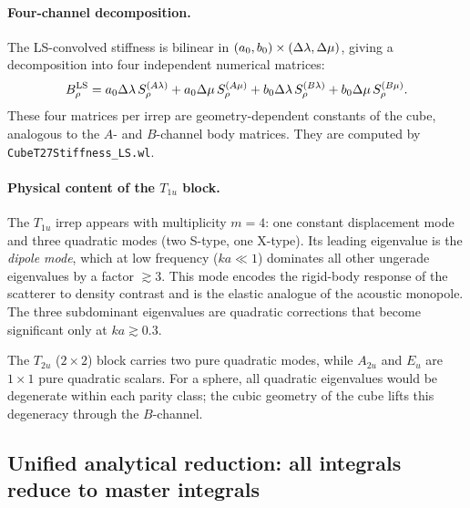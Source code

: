 \paragraph{Four-channel decomposition.}
The LS-convolved stiffness is bilinear in
$(a_0, b_0) \times (\Delta\lambda, \Delta\mu)$, giving a decomposition into
four independent numerical matrices:
\begin{equation}
  B^{\text{LS}}_\rho
  = a_0 \Delta\lambda\,S^{(A\lambda)}_\rho
  + a_0 \Delta\mu\,S^{(A\mu)}_\rho
  + b_0 \Delta\lambda\,S^{(B\lambda)}_\rho
  + b_0 \Delta\mu\,S^{(B\mu)}_\rho.
  \label{eq:four-channel}
\end{equation}
These four matrices per irrep are geometry-dependent constants of the
cube, analogous to the $A$- and $B$-channel body matrices.  They are
computed by \texttt{CubeT27Stiffness\_LS.wl}.

\paragraph{Physical content of the $T_{1u}$ block.}
The $T_{1u}$ irrep appears with multiplicity $m = 4$: one constant
displacement mode and three quadratic modes (two S-type, one X-type).
Its leading eigenvalue is the \emph{dipole mode}, which at low
frequency ($ka \ll 1$) dominates all other ungerade eigenvalues
by a factor $\gtrsim 3$.  This mode encodes the rigid-body response
of the scatterer to density contrast and is the elastic analogue of
the acoustic monopole.  The three subdominant eigenvalues are
quadratic corrections that become significant only at $ka \gtrsim 0.3$.

The $T_{2u}$ ($2 \times 2$) block carries two pure quadratic modes,
while $A_{2u}$ and $E_u$ are $1 \times 1$ pure quadratic scalars.
For a sphere, all quadratic eigenvalues would be degenerate within
each parity class; the cubic geometry of the cube lifts this degeneracy
through the $B$-channel.

\subsection{Unified analytical reduction: all integrals reduce to
master integrals}
\label{sec:analytical-reduction}

